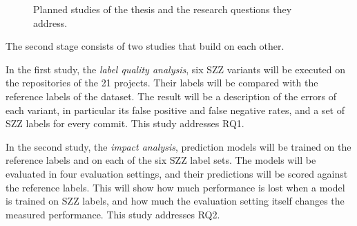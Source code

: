 \documentclass[12pt,a4paper,oneside]{report}
\begin{document}
\begin{figure}[htbp]
\centering
{}
\caption{Planned studies of the thesis and the research questions they
address.}
\label{fig:plan}
\end{figure}

The second stage consists of two studies that build on each other.

In the first study, the \emph{label quality analysis}, six SZZ variants will
be executed on the repositories of the 21 projects. Their labels will be
compared with the reference labels of the dataset. The result will be a
description of the errors of each variant, in particular its false positive
and false negative rates, and a set of SZZ labels for every commit. This
study addresses RQ1.

In the second study, the \emph{impact analysis}, prediction models will be
trained on the reference labels and on each of the six SZZ label sets. The
models will be evaluated in four evaluation settings, and their predictions
will be scored against the reference labels. This will show how much
performance is lost when a model is trained on SZZ labels, and how much the
evaluation setting itself changes the measured performance. This study
addresses RQ2.
\end{document}
